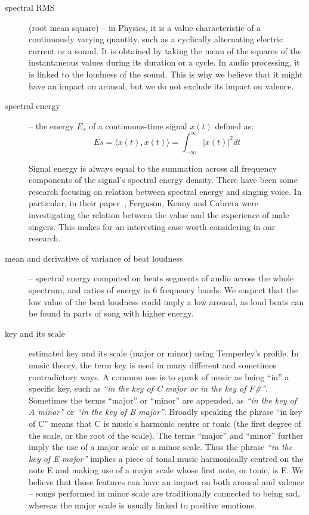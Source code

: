 \begin{description}
\item[spectral RMS] (root mean square) -- in Physics, it is a value characteristic of a continuously varying quantity, such as a cyclically alternating electric current or a sound. It is obtained by taking the mean of the squares of the instantaneous values during its duration or a cycle. In audio processing, it is linked to the loudness of the sound. This is why we believe that it might have an impact on arousal, but we do not exclude its impact on valence.

\item[spectral energy] -- the energy $E_{s}$ of a continuous-time signal $x(t)$ defined as: 
\begin{equation}
E{s}  =  \langle x(t), x(t)\rangle =  \int_{-\infty}^{\infty}{|x(t)|^2}dt
\end{equation}

Signal energy is always equal to the summation across all frequency components of the signal's spectral energy density. 
There have been some research focusing on relation between spectral energy and singing voice. In particular, in their paper~\cite{spectralenergy}, Ferguson, Kenny and Cabrera were investigating the relation between the value and the experience of male singers. This makes for an interesting case worth considering in our research.

\item[mean and derivative of variance of beat loudness] --  spectral energy computed on beats segments of audio across the whole spectrum, and ratios of energy in 6 frequency bands. We suspect that the low value of the beat loudness could imply a low arousal, as loud beats can be found in parts of song with higher energy.

\item[key and its scale] estimated key and its scale (major or minor) using Temperley’s profile. 
In music theory, the term key is used in many different and sometimes contradictory ways. A common use is to speak of music as being ``in'' a specific key, such as \textit{``in the key of C major or in the key of F\#''}. Sometimes the terms ``major'' or ``minor'' are appended, as \textit{``in the key of A minor''} or \textit{``in the key of B major''}.
Broadly speaking the phrase ``in key of C'' means that C is music's harmonic centre or tonic (the first degree of the scale, or the root of the scale). 
The terms ``major'' and ``minor'' further imply the use of a major scale or a minor scale. Thus the phrase \textit{``in the key of E major''} implies a piece of tonal music harmonically centred on the note E and making use of a major scale whose first note, or tonic, is E. 
We believe that those features can have an impact on both arousal and valence -- songs performed in minor scale are traditionally connected to being sad, whereas the major scale is usually linked to positive emotions.


\end{description}
